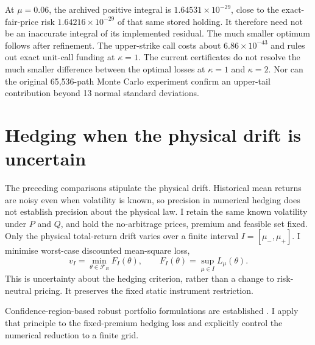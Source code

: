 \documentclass[11pt]{article}
\begin{document}
At $\mu=0.06$, the archived positive integral is
$1.64531\times10^{-29}$, close to the exact-fair-price risk
$1.64216\times10^{-29}$ of that same stored holding. It therefore
need not be an inaccurate integral of its implemented residual.
The much smaller optimum follows after refinement. The upper-strike
call costs about $6.86\times10^{-43}$ and rules out exact unit-call
funding at $\kappa=1$. The current certificates do not resolve the much
smaller difference between the optimal losses at $\kappa=1$ and
$\kappa=2$. Nor can the original 65,536-path Monte Carlo experiment
confirm an upper-tail contribution beyond 13 normal standard deviations.

\section{Hedging when the physical drift is uncertain}
\label{sec:h-drift-robust}

The preceding comparisons stipulate the physical drift. Historical mean
returns are noisy even when volatility is known, so precision in numerical
hedging does not establish precision about the physical law. I retain the
same known volatility under $P$ and $Q$, and hold the no-arbitrage prices,
premium and feasible set fixed. Only the physical total-return drift varies
over a finite interval $I=[\mu_-,\mu_+]$. I minimise worst-case discounted
mean-square loss,
\begin{equation}
 v_I=\min_{\theta\in\mathcal F_B}F_I(\theta),\qquad
 F_I(\theta)=\sup_{\mu\in I}L_\mu(\theta).
 \label{eq:h-robust-drift-target}
\end{equation}
This is uncertainty about the hedging criterion, rather than a change to
risk-neutral pricing. It preserves the fixed static instrument restriction.

Confidence-region-based robust portfolio formulations are established
\citep{goldfarbiyengar2003}. I apply that principle to the fixed-premium
hedging loss and explicitly control the numerical reduction to a finite grid.
\end{document}
